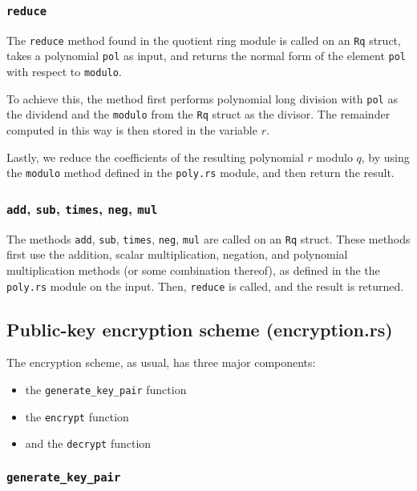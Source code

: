 \documentclass[../main.tex]{subfiles}
\begin{document}
\subsubsection{\lstinline{reduce}}

The \lstinline{reduce} method found in the quotient ring module is called on an \lstinline{Rq} struct, takes a polynomial \lstinline{pol} as input, and returns the normal form of the element \lstinline{pol} with respect to \lstinline{modulo}.

To achieve this, the method first performs polynomial long division with \lstinline{pol} as the dividend and the \lstinline{modulo} from the \lstinline{Rq} struct as the divisor. The remainder computed in this way is then stored in the variable $r$.

Lastly, we reduce the coefficients of the resulting polynomial $r$ modulo $q$, by using the \lstinline{modulo} method defined in the \lstinline{poly.rs} module, and then return the result.

\subsubsection{\lstinline{add}, \lstinline{sub}, \lstinline{times}, \lstinline{neg}, \lstinline{mul}}

The methods \lstinline{add}, \lstinline{sub}, \lstinline{times}, \lstinline{neg}, \lstinline{mul} are called on an \lstinline{Rq} struct.
These methods first use the addition, scalar multiplication, negation, and polynomial multiplication methods (or some combination thereof), as defined in the the \lstinline{poly.rs} module on the input.
Then, \lstinline{reduce} is called, and the result is returned.

\subsection{Public-key encryption scheme (encryption.rs)}

The encryption scheme, as usual, has three major components:

\begin{itemize}
  \item the \lstinline{generate_key_pair} function
  \item the \lstinline{encrypt} function
  \item and the \lstinline{decrypt} function
\end{itemize}

\subsubsection{\lstinline{generate_key_pair}}
\end{document}

